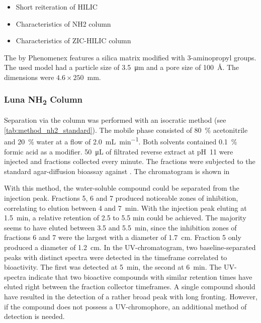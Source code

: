 	\begin{itemize}
		\item Short reiteration of HILIC
		\item Characteristics of NH2 column
		\item Characteristics of ZIC-HILIC column
	\end{itemize}

	The \luna by Phenomenex features a silica matrix modified with 3-aminopropyl groups.
	The used model had a particle size of \SI{3.5}{\micro\meter} and a pore size of 100~\AA.
	The dimensions were $4.6\times250$~mm.
    
	    \subsubsection{Luna NH\textsubscript{2} Column}
	    
	    Separation via the \luna column was performed with an isocratic method (see \ref{tab:method_nh2_standard}).
	    The mobile phase consisted of 80~\% acetonitrile and 20~\% water at a flow of \SI{2.0}{\milli\liter\per\minute}.
	    Both solvents contained 0.1~\% formic acid as a modifier.
	    \SI{50}{\micro\liter} of filtrated reverse extract at pH~11 were injected and fractions collected every minute.
	    The fractions were subjected to the standard agar-diffusion bioassay against \coli.
	    The chromatogram is shown in 
	    
	    
	    With this method, the water-soluble compound could be separated from the injection peak.
	    Fractions 5, 6 and 7 produced noticeable zones of inhibition, correlating to elution between 4 and 7~min.
	    With the injection peak eluting at 1.5~min, a relative retention of 2.5 to 5.5 min could be achieved.
	    The majority seems to have eluted between 3.5 and 5.5~min, since the inhibition zones of fractions 6 and 7 were the largest with a diameter of \SI{1.7}{\centi\meter}.
	    Fraction 5 only produced a diameter of \SI{1.2}{\centi\meter}.
	    In the UV-chromatogram, two baseline-separated peaks with distinct spectra were detected in the timeframe correlated to bioactivity.
	    The first was detected at 5~min, the second at 6~min. The UV-spectra  indicate that two bioactive compounds with similar retention times have eluted right between the fraction collector timeframes.
	    A single compound should have resulted in the detection of a rather broad peak with long fronting.
	    However, if the compound does not possess a UV-chromophore, an additional method of detection is needed.


